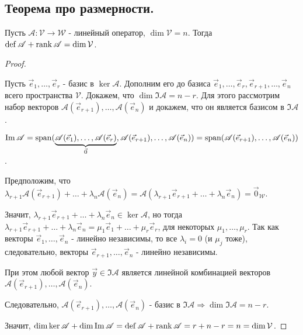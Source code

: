 \subsection{
    Теорема про размерности.
}

\begin{theorem}
    Пусть $\mathscr{A} \colon \mathcal{V} \to \mathcal{W}$ - линейный оператор, $\dim \mathcal{V} = n$. Тогда $\operatorname{\mathop{\mathrm{def}}} \mathscr{A} + \operatorname{\mathop{\mathrm{rank}}} \mathscr{A} = \dim \mathcal{V}$.
\end{theorem}

\begin{proof}~

    Пусть $\vec{e}_1, \ldots, \vec{e}_r$ - базис в $\ker \mathscr{A}$. Дополним его до базиса $\vec{e}_1, \ldots, \vec{e}_r, \vec{e}_{r + 1}, \ldots, \vec{e}_n$ всего пространства $\mathcal{V}$. Докажем, что $\dim \Im \mathscr{A} = n - r$. Для этого рассмотрим набор векторов $\mathscr{A}(\vec{e}_{r + 1}), \ldots, \mathscr{A}(\vec{e}_n)$ и докажем, что он является базисом в $\Im \mathscr{A}$.

    \bigbreak

    $\operatorname{\mathop{\mathrm{Im}}} \mathscr{A} = \operatorname{\mathop{\mathrm{span}}}(\underbrace{\mathscr{A}(\vec{e}_1), \ldots, \mathscr{A}(\vec{e}_r)}_{\vec{0}}, \mathscr{A}(\vec{e}_{r + 1}), \ldots, \mathscr{A}(\vec{e}_n)) = \operatorname{\mathop{\mathrm{span}}}(\mathscr{A}(\vec{e}_{r + 1}), \ldots, \mathscr{A}(\vec{e}_n))$.

    Предположим, что $\lambda_{r + 1}\mathscr{A}(\vec{e}_{r + 1}) + \ldots + \lambda_n\mathscr{A}(\vec{e}_n) = \mathscr{A}(\lambda_{r + 1}\vec{e}_{r + 1} + \ldots + \lambda_n\vec{e}_n) = \vec{0}_{\mathcal{W}}.$

    Значит, $\lambda_{r + 1}\vec{e}_{r + 1} + \ldots + \lambda_n\vec{e}_n \in \ker \mathscr{A}$, но тогда $\lambda_{r + 1}\vec{e}_{r + 1} + \ldots + \lambda_n\vec{e}_n = \mu_1\vec{e}_1 + \ldots + \mu_r\vec{e}_r$, для некоторых $\mu_1, \ldots, \mu_r$. Так как векторы $\vec{e}_1, \ldots, \vec{e}_n$ - линейно независимы, то все $\lambda_i = 0$ (и $\mu_j$ тоже), следовательно, векторы $\vec{e}_{r + 1}, \ldots, \vec{e}_n$ - линейно независимы.

    \bigbreak

    При этом любой вектор $\vec{y} \in \Im \mathscr{A}$ является линейной комбинацией векторов $\mathscr{A}(\vec{e}_{r + 1}), \ldots, \mathscr{A}(\vec{e}_n)$.

    \bigbreak

    Следовательно, $\mathscr{A}(\vec{e}_{r + 1}), \ldots, \mathscr{A}(\vec{e}_n)$ - базис в $\Im \mathscr{A} \Rightarrow \dim \Im \mathscr{A} = n - r$.

    \bigbreak

    Значит, $\dim \ker \mathscr{A} + \dim \operatorname{\mathop{\mathrm{Im}}} \mathscr{A} = \operatorname{\mathop{\mathrm{def}}} \mathscr{A} + \operatorname{\mathop{\mathrm{rank}}} \mathscr{A} = r + n - r = n = \dim \mathcal{V}$.
\end{proof}

